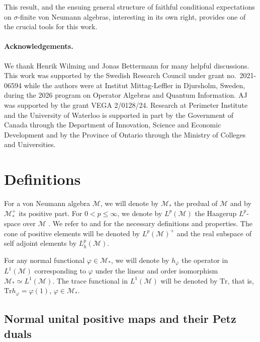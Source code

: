 \documentclass[12pt]{article}
\def\Me{\mathcal M}
\def\Tr{\mathrm{Tr}}
\theoremstyle{definition}
\theoremstyle{remark}
\begin{document}
This result, and the ensuing general structure of faithful conditional expectations on
$\sigma$-finite von Neumann algebras, interesting in its own right, provides one of the
crucial tools for this work. 




\paragraph{Acknowledgements.}
We thank Henrik Wilming and Jonas Bettermann for many helpful discussions. 
This work was supported by the Swedish Research Council under grant no.\ 2021-06594 while the authors were at Institut Mittag-Leffler in Djursholm, Sweden, during the 2026 program on Operator Algebras and Quantum Information.
AJ was supported by the grant VEGA 2/0128/24. 
Research at Perimeter Institute and the University of Waterloo is supported in part by the
Government of Canada through the Department of Innovation, Science and Economic
Development and by the Province of Ontario through the Ministry of Colleges and
Universities. 




\section{Definitions}



For a von Neumann algebra $\Me$, we will denote  by $\Me_*$ the predual of $\Me$  and
by $\Me_*^+$ its positive part. For $0<p\le \infty$, we denote by $L^p(\Me)$ the Haagerup
$L^p$-space over $\Me$ \cite{haagerup1979lpspaces}. 
We refer to \cite{terp1981lpspaces}
and \cite[Sec.~9]{hiai2021lectures} for the necessary definitions and properties. The cone
of positive elements will be denoted by $L^p(\Me)^+$ and the real subspace of self adjoint
elements by $L_h^p(\Me)$.

For any normal functional $\varphi\in \Me_*$, we will denote by $h_\varphi$ the operator in
$L^1(\Me)$ corresponding to $\varphi$ under the linear and order isomorphism $\Me_*\simeq
L^1(\Me)$. The trace functional in $L^1(\Me)$ will be denoted by $\Tr$, that is, $\Tr
h_\varphi=\varphi(1)$, $\varphi\in \Me_*$.



\subsection{Normal unital positive maps and their Petz duals}
\end{document}
